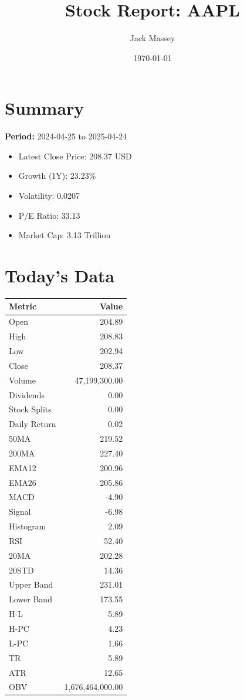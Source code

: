 \documentclass{article}
\title{Stock Report: AAPL}
\author{Jack Massey}
\date{\today}
\begin{document}
\maketitle

\section*{Summary}
\textbf{Period:} 2024-04-25 to 2025-04-24

\begin{itemize}
    \item Latest Close Price: 208.37 USD
    \item Growth (1Y): 23.23\%
    \item Volatility: 0.0207
    \item P/E Ratio: 33.13
    \item Market Cap: 3.13 Trillion
\end{itemize}

\section*{Today's Data}
\begin{tabular}{lr}\textbf{Metric} & \textbf{Value} \\
\hline
Open & 204.89 \\
High & 208.83 \\
Low & 202.94 \\
Close & 208.37 \\
Volume & 47,199,300.00 \\
Dividends & 0.00 \\
Stock Splits & 0.00 \\
Daily Return & 0.02 \\
50MA & 219.52 \\
200MA & 227.40 \\
EMA12 & 200.96 \\
EMA26 & 205.86 \\
MACD & -4.90 \\
Signal & -6.98 \\
Histogram & 2.09 \\
RSI & 52.40 \\
20MA & 202.28 \\
20STD & 14.36 \\
Upper Band & 231.01 \\
Lower Band & 173.55 \\
H-L & 5.89 \\
H-PC & 4.23 \\
L-PC & 1.66 \\
TR & 5.89 \\
ATR & 12.65 \\
OBV & 1,676,464,000.00 \\
\end{tabular}
\end{document}
